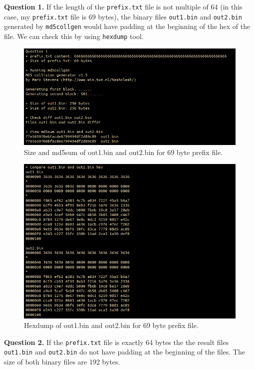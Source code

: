 \documentclass{article}
\begin{document}
\textbf{Question 1.} If the length of the \texttt{prefix.txt} file is not multiple
of 64 (in this case, my \texttt{prefix.txt} file is 69 bytes), the binary files
\texttt{out1.bin} and \texttt{out2.bin} generated by \texttt{md5collgen} would
have padding at the beginning of the hex of the file. We can check this by using
\texttt{hexdump} tool.

\begin{figure}[!ht]
    \centering
    \includegraphics[scale=0.5]{task1.1.1.png}
    \caption{Size and md5sum of out1.bin and out2.bin for 69 byte prefix file.}
\end{figure}

\begin{figure}[!ht]
    \centering
    \includegraphics[scale=0.5]{task1.1.2.png}
    \caption{Hexdump of out1.bin and out2.bin for 69 byte prefix file.}
\end{figure}

\textbf{Question 2.} If the \texttt{prefix.txt} file is exactly 64 bytes the the
result files \texttt{out1.bin} and \texttt{out2.bin} do not have padding at the
beginning of the files. The size of both binary files are 192 bytes.
\end{document}
